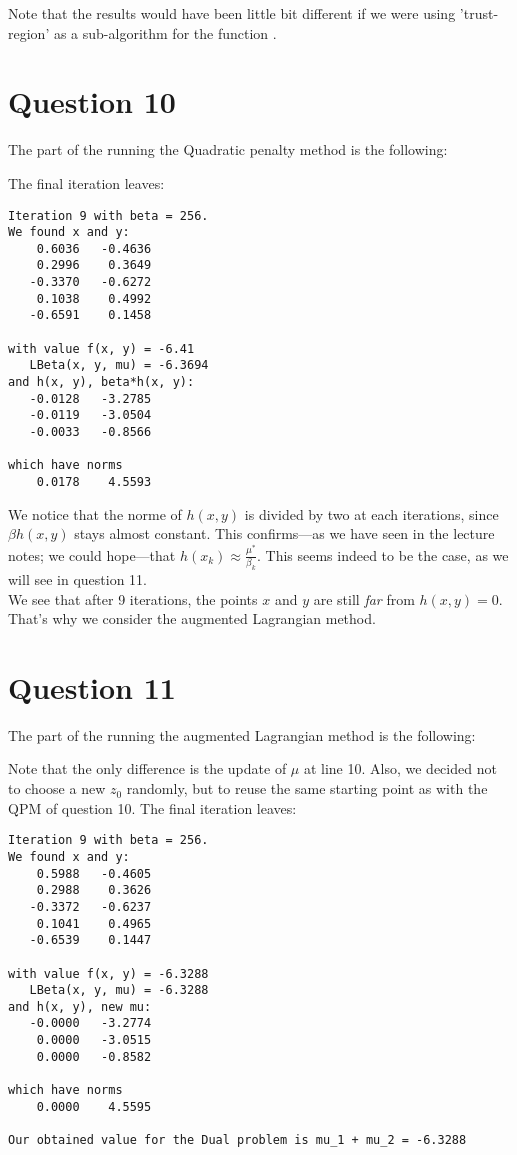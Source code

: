 \documentclass{article}
\begin{document}
Note that the results would have been little bit different if we were using 'trust-region' as a sub-algorithm for the function .


\section*{Question 10}
The part of the  running the Quadratic penalty method is the following:


The final iteration leaves:
\begin{lstlisting}
Iteration 9 with beta = 256.
We found x and y:
    0.6036   -0.4636
    0.2996    0.3649
   -0.3370   -0.6272
    0.1038    0.4992
   -0.6591    0.1458

with value f(x, y) = -6.41
   LBeta(x, y, mu) = -6.3694
and h(x, y), beta*h(x, y):
   -0.0128   -3.2785
   -0.0119   -3.0504
   -0.0033   -0.8566

which have norms
    0.0178    4.5593
\end{lstlisting}

We notice that the norme of $h(x, y)$ is divided by two at each iterations, since $\beta h(x, y)$ stays almost constant.
This confirms---as we have seen in the lecture notes; we could hope---that $h(x_k) \approx \frac{\mu^*}{\beta_k}$. This seems indeed to be the case, as we will see in question 11.\\
We see that after 9 iterations, the points $x$ and $y$ are still \textit{far} from $h(x, y) = 0$. That's why we consider the augmented Lagrangian method.


\section*{Question 11}
The part of the  running the augmented Lagrangian method is the following:


Note that the only difference is the update of $\mu$ at line 10. Also, we decided not to choose a new $z_0$ randomly, but to reuse the same starting point as with the QPM of question 10.
The final iteration leaves:
\begin{lstlisting}
Iteration 9 with beta = 256.
We found x and y:
    0.5988   -0.4605
    0.2988    0.3626
   -0.3372   -0.6237
    0.1041    0.4965
   -0.6539    0.1447

with value f(x, y) = -6.3288
   LBeta(x, y, mu) = -6.3288
and h(x, y), new mu:
   -0.0000   -3.2774
    0.0000   -3.0515
    0.0000   -0.8582

which have norms
    0.0000    4.5595

Our obtained value for the Dual problem is mu_1 + mu_2 = -6.3288
\end{lstlisting}
\end{document}
